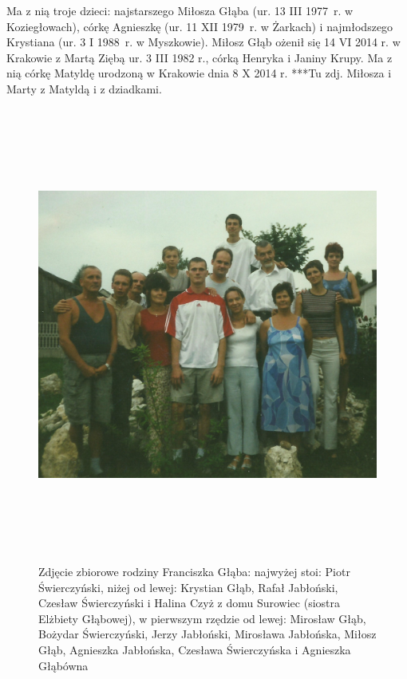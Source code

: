 Ma z nią troje dzieci: najstarszego Miłosza Głąba (ur. 13 III 1977~r. w Koziegłowach), córkę Agnieszkę (ur. 11 XII 1979~r. w Żarkach) i najmłodszego Krystiana (ur. 3 I 1988~r. w Myszkowie).
Miłosz Głąb ożenił się 14 VI 2014 r. w Krakowie z Martą Ziębą ur. 3 III 1982 r., córką Henryka i Janiny Krupy. Ma z nią córkę Matyldę urodzoną w Krakowie dnia 8 X 2014 r. 
***Tu zdj. Miłosza i Marty z Matyldą i z dziadkami.
\begin{figure}
\begin{center}
\includegraphics[height=150mm]{zdjecia/rodzina_franciszka_glaba.jpg}
\caption[Zdjęcie zbiorowe rodziny Franciszka Głąba]{Zdjęcie zbiorowe rodziny Franciszka Głąba: najwyżej stoi: Piotr Świerczyński, niżej od lewej: Krystian Głąb, Rafał Jabłoński, Czesław Świerczyński i Halina Czyż z domu Surowiec (siostra Elżbiety Głąbowej), w pierwszym rzędzie od lewej: Mirosław Głąb, Bożydar Świerczyński, Jerzy Jabłoński, Mirosława Jabłońska, Miłosz Głąb, Agnieszka Jabłońska, Czesława Świerczyńska i Agnieszka Głąbówna}
\label{rys:rodzina_franciszka_glaba}
\end{center}
\end{figure}